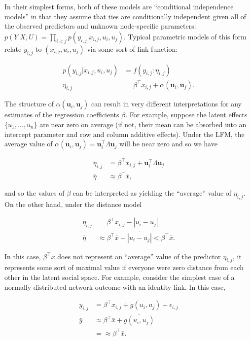\documentclass[11pt,pdflatex]{elsarticle}
\begin{document}
In their simplest forms, both of these models are ``conditional independence models'' in that they assume that ties are conditionally independent given all of the observed predictors and unknown node-specific parameters: $p( Y | X , U ) = \prod_{i<j} p( y_{i,j}  | x_{i,j} , u_i , u_j)$. Typical parametric models of this form relate $y_{i,j}$ to $(x_{i,j},u_i,u_j)$ via some sort of link function:

\begin{align*}
	p(y_{i,j} | x_{i,j}, u_i , u_j ) & = f( y_{i,j} : \eta_{i,j} ) \\
	\eta_{i,j} &= \beta^\top x_{i,j} + \alpha(\textbf{u}_{i}, \textbf{u}_{j}).
\end{align*}

The structure of $\alpha(\textbf{u}_{i}, \textbf{u}_{j})$ can result in very different interpretations for any estimates of the regression coefficients $\beta$. For example, suppose the latent effects $\{ u_1,\ldots, u_n\}$ are near zero on average (if not, their mean can be absorbed into an intercept parameter and row and column additive effects). Under the LFM, the average value of $\alpha(\textbf{u}_{i}, \textbf{u}_{j}) = \textbf{u}_{i}^{\top} \Lambda \textbf{u}_{j}$ will be near zero and so we have

\begin{align*}
	\eta_{i,j} & =  \beta^\top x_{i,j} + \textbf{u}_{i}^{\top} \Lambda \textbf{u}_{j} \\
	\bar \eta & \approx  \beta^\top \bar x ,
\end{align*}

and so the values of $\beta$ can be interpreted as yielding the ``average'' value of $\eta_{i,j}$. On the other hand,  under the distance model

\begin{align*}
	\eta_{i,j} & =  \beta^\top x_{i,j} - | u_i -  u_j|  \\
	\bar \eta & \approx  \beta^\top \bar x - \overline{ | u_i -  u_j| } <  \beta^\top \bar x .
\end{align*}

In this case, $\beta^\top \bar x$ does not represent an ``average'' value of the predictor $\eta_{i,j}$, it represents some sort of maximal value if everyone were zero distance from each other in the latent social space. For example, consider the simplest case of a normally distributed network  outcome with an identity link. In this case,

\begin{align*}
	y_{i,j} & = \beta^\top x_{i,j} + g(u_i,u_j) + \epsilon_{i,j} \\
	\bar y & \approx \beta^\top \bar x + \overline{ g(u_i,u_j) }   \\
	& = \approx \beta^\top \bar x.
\end{align*}
\end{document}
